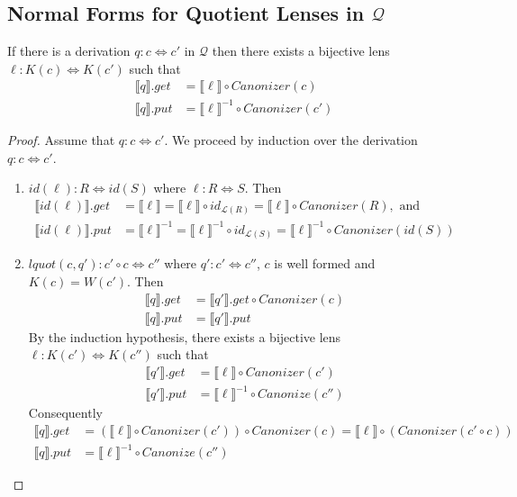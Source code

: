 \documentclass{svproc}
\begin{document}
\subsection{Normal Forms for Quotient Lenses in $\mathcal{Q}$}
\begin{theorem}\label{normal form}
If there is a derivation $q : c \Leftrightarrow c'$ in
$\mathcal{Q}$ then there exists a bijective lens $\ell : K(c) \Leftrightarrow
K(c')$ such that
\begin{align*}
\llbracket q \rrbracket.get &= \llbracket \ell \rrbracket\circ Canonizer(c)\\
\llbracket q \rrbracket.put &= \llbracket \ell \rrbracket^{-1} \circ
Canonizer(c')
\end{align*}
\end{theorem}
\begin{proof}
Assume that $q : c \Leftrightarrow c'$. We proceed by induction over the
derivation $q : c \Leftrightarrow c'$.
\begin{enumerate}
  \item
  $id(\ell): R \Leftrightarrow id(S)$ where $\ell : R \Leftrightarrow
S$. Then
  \begin{align*}
  \llbracket id(\ell) \rrbracket.get &=  \llbracket \ell \rrbracket = \llbracket \ell \rrbracket \circ
  id_{\mathcal{L}(R)} = \llbracket \ell \rrbracket \circ Canonizer(R), \text{ and }\\
  \llbracket id(\ell) \rrbracket.put &= \llbracket \ell \rrbracket^{-1} = \llbracket \ell \rrbracket^{-1} \circ
  id_{\mathcal{L}(S)} = \llbracket \ell \rrbracket^{-1} \circ Canonizer(id(S))
  \end{align*}
  \item
  $lquot(c, q'): c' \circ c \Leftrightarrow c''$ where $q' : c' 
  \Leftrightarrow c''$, $c$ is well formed and $K(c) = W(c')$. Then
\begin{align*}
  \llbracket q \rrbracket.get  &= \llbracket q'
  \rrbracket.get \circ Canonizer(c)\\
  \llbracket q \rrbracket.put &= \llbracket q' \rrbracket.put
  \end{align*}
  By the induction hypothesis, there exists a bijective lens $\ell :
  K(c') \Leftrightarrow K(c'')$ such that 
  \begin{align*}
\llbracket q' \rrbracket.get &= \llbracket \ell \rrbracket \circ Canonizer(c')\\
\llbracket q' \rrbracket.put &= \llbracket \ell \rrbracket^{-1} \circ
Canonize(c'')
\end{align*}
Consequently
\begin{align*}
  \llbracket q \rrbracket.get  &= (\llbracket \ell \rrbracket \circ
  Canonizer(c')) \circ Canonizer(c) = \llbracket \ell \rrbracket \circ
  (Canonizer(c' \circ c))\\
  \llbracket q \rrbracket.put &= \llbracket \ell \rrbracket^{-1} \circ
  Canonize(c'')
  \end{align*}


\end{enumerate}
\end{proof}
\end{document}
